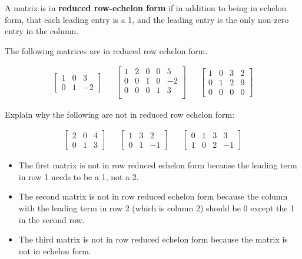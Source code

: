 \begin{definition}
A matrix is in \textbf{reduced row-echelon form} if in addition to being in echelon form, that each leading entry is a 1, and the leading entry is the only non-zero entry in the column.  
\end{definition}

\phantom{Empty Text}

\begin{example}
The following matrices are in reduced row echelon form.

\begin{align*}
\begin{bmatrix}
1 & 0 & 3 \\
0 & 1 & -2 
\end{bmatrix} &&
\begin{bmatrix}
1 & 2 & 0 & 0 & 5 \\
0 & 0 & 1 & 0 & -2 \\
0 & 0 & 0 & 1 & 3 \\
\end{bmatrix} &&
\begin{bmatrix}
1 & 0 & 3 & 2 \\
0 & 1 & 2 & 9 \\
0 & 0 & 0 & 0 
\end{bmatrix}
\end{align*}
\end{example}

\begin{example}
Explain why the following are not in reduced row echelon form:

\begin{align*}
\begin{bmatrix}
2 & 0 & 4 \\
0 & 1 & 3
\end{bmatrix} &&
\begin{bmatrix}
1 & 3 & 2 \\
0 & 1 & -1 
\end{bmatrix} &&
\begin{bmatrix}
0 & 1 & 3 & 3 \\
1 & 0 & 2 & -1 
\end{bmatrix}
\end{align*}

\solution

\begin{itemize}
\item The first matrix is not in row reduced echelon form because the leading term in row 1 needs to be a 1, not a 2. 
\item The second matrix is not in row reduced echelon form because the column with the leading term in row 2 (which is column 2) should be 0 except the 1 in the second row. 
\item The third matrix is not in row reduced echelon form because the matrix is not in echelon form. 
\end{itemize}
\end{example}

